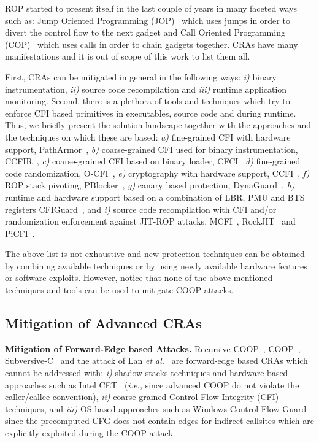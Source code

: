 ROP started to present itself in the last couple of years in many faceted ways such as:
Jump Oriented Programming (JOP)~\cite{JOP1, JOP2, JOP3} which uses jumps in order to divert the control flow to the next gadget and 
Call Oriented Programming (COP)~\cite{rop:carlini} which uses calls in order to chain gadgets together.
CRAs have many manifestations and it is out of scope of this work to list them all.

First, CRAs can be mitigated in general in the following ways: 
\textit{i)} binary instrumentation,
\textit{ii)} source code recompilation and 
\textit{iii)} runtime application monitoring.
Second, there is a plethora of tools and techniques which try to enforce CFI based
primitives in executables, source code and during runtime. Thus, we briefly
present the solution landscape together with the approaches and the techniques on which these are based:
\textit{a)} fine-grained CFI with hardware support, PathArmor~\cite{veen:cfi},
\textit{b)} coarse-grained CFI used for binary instrumentation, CCFIR~\cite{ccfir:zhang},
\textit{c)} coarse-grained CFI based on binary loader, CFCI~\cite{cfci:zhang}
\textit{d)} fine-grained code randomization, O-CFI~\cite{mohan:opaque},
\textit{e)} cryptography with hardware support, CCFI~\cite{ccfi:jose},
\textit{f)} ROP stack pivoting, PBlocker~\cite{pblocker:prakash},
\textit{g)} canary based protection, DynaGuard~\cite{dynaguard:petsios},
\textit{h)} runtime and hardware support based on a combination of LBR, PMU and BTS registers CFIGuard~\cite{cfiguard:yuan}, and
\textit{i)} source code recompilation with CFI and/or randomization enforcement against JIT-ROP attacks, MCFI~\cite{mcfi:niu}, 
RockJIT~\cite{rockjit:niu} and PiCFI~\cite{perinput:niu}.

The above list is not exhaustive and new protection techniques can be obtained by combining available techniques
or by using newly available hardware features or software exploits. However, notice that none of the above mentioned 
techniques and tools can be used to mitigate COOP attacks.

\subsection{Mitigation of Advanced CRAs}
\textbf{Mitigation of Forward-Edge based Attacks.}
\label{Mitigation of Advanced Code-Reuse Attacks}
Recursive-COOP~\cite{crane:readactor++}, COOP~\cite{schuster:coop}, Subversive-C~\cite{subversive-c:lettner} and the attack of Lan \textit{et al.}~\cite{loop:oriented} are 
forward-edge based CRAs which cannot be addressed with:
\textit{i)}  shadow stacks techniques and hardware-based approaches such as Intel CET~\cite{intel:cet} (\textit{i.e.,} since advanced COOP do not violate 
the caller/callee convention), 
\textit{ii)} coarse-grained Control-Flow Integrity (CFI)~\cite{abadi:cfi2, abadi:cfi} techniques, and 
\textit{iii)} OS-based approaches such as Windows Control Flow Guard~\cite{windows:cfguard} 
since the precomputed CFG does not contain edges for indirect callsites which are explicitly exploited during the COOP attack.

